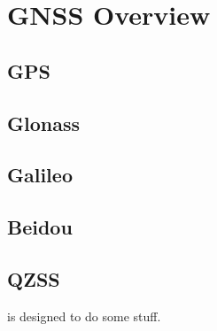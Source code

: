 \chapter{GNSS Overview}
\label{ch:GNSSOverview}

\section{GPS}

\section{Glonass}

\section{Galileo}

\section{Beidou}

\section{QZSS}

 is designed to do some stuff.